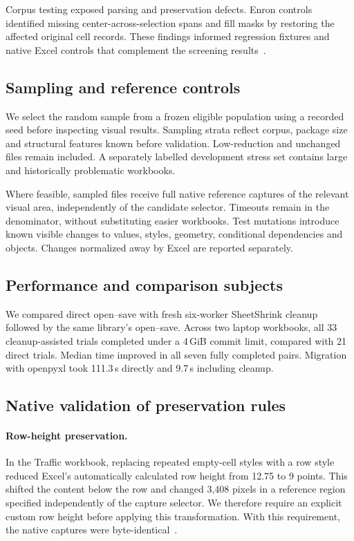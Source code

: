Corpus testing exposed parsing and preservation defects. Enron controls identified
missing center-across-selection spans and fill masks by restoring the affected
original cell records. These findings informed regression fixtures and native
Excel controls that complement the screening results~\cite{enrondefaultcontrols}.

\subsection{Sampling and reference controls}
We select the random sample from a frozen eligible population using a recorded
seed before inspecting visual results. Sampling strata reflect corpus, package
size and structural features known before validation. Low-reduction and unchanged
files remain included. A separately labelled development stress set contains large
and historically problematic workbooks.

Where feasible, sampled files receive full native reference captures of the
relevant visual area, independently of the candidate selector. Timeouts remain in
the denominator, without substituting easier workbooks. Test mutations introduce
known visible changes to values, styles, geometry, conditional dependencies and
objects. Changes normalized away by Excel are reported separately.

\subsection{Performance and comparison subjects}
We compared direct open--save with fresh six-worker SheetShrink cleanup followed
by the same library's open--save. Across two laptop workbooks, all 33
cleanup-assisted trials completed under a 4\,GiB commit limit, compared with 21
direct trials. Median time improved in all seven fully completed pairs. Migration
with openpyxl took 111.3\,s directly and 9.7\,s including cleanup.






\subsection{Native validation of preservation rules}
\paragraph{Row-height preservation.}
In the Traffic workbook, replacing repeated empty-cell styles with a row style
reduced Excel's automatically calculated row height from 12.75 to 9 points. This
shifted the content below the row and changed 3,408 pixels in a reference region
specified independently of the capture selector. We therefore require an explicit
custom row height before applying this transformation. With this requirement,
the native captures were byte-identical~\cite{rowpromotionfix}.

